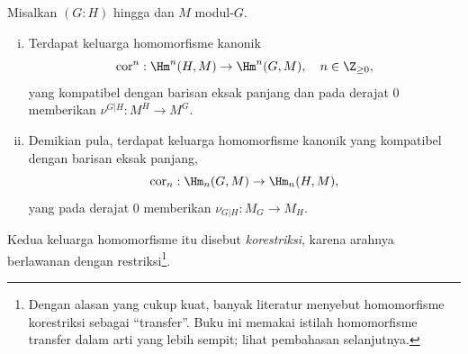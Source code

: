 \begin{definisi-proposisi}\label{def:cor}
	Misalkan $(G:H)$ hingga dan $M$ modul-$G$.
	\begin{enumerate}[(i)]
		\item Terdapat keluarga homomorfisme kanonik
		\[ \mathrm{cor}^n: \Hm^n(H, M) \to \Hm^n(G, M), \quad n \in \Z_{\geq 0}, \]
		yang kompatibel dengan barisan eksak panjang dan pada derajat $0$
		memberikan $\nu^{G|H}:M^H\to M^G$.
		\item Demikian pula, terdapat keluarga homomorfisme kanonik yang
		kompatibel dengan barisan eksak panjang,
		\[ \mathrm{cor}_n: \Hm_n(G, M) \to \Hm_n(H, M), \]
		yang pada derajat $0$ memberikan $\nu_{G|H}:M_G\to M_H$.
	\end{enumerate}
	Kedua keluarga homomorfisme itu disebut \emph{korestriksi}, karena arahnya
	berlawanan dengan restriksi\footnote{Dengan alasan yang cukup kuat, banyak
	literatur menyebut homomorfisme korestriksi sebagai ``transfer''. Buku ini
	memakai istilah homomorfisme transfer dalam arti yang lebih sempit; lihat
	pembahasan selanjutnya.}.
\end{definisi-proposisi}

